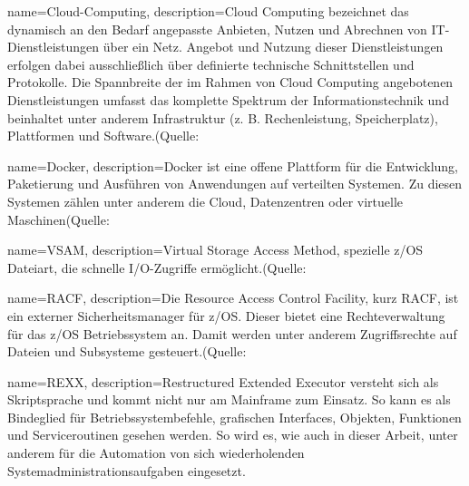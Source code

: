 {
	name=Cloud-Computing,
	description={\glqq Cloud Computing bezeichnet das dynamisch an den Bedarf angepasste Anbieten, Nutzen und Abrechnen von IT-Dienstleistungen über ein Netz. Angebot und Nutzung dieser Dienstleistungen erfolgen dabei ausschließlich über definierte technische Schnittstellen und Protokolle. Die Spannbreite der im Rahmen von Cloud Computing angebotenen Dienstleistungen umfasst das komplette Spektrum der Informationstechnik und beinhaltet unter anderem Infrastruktur (z. B. Rechenleistung, Speicherplatz), Plattformen und Software.\grqq(Quelle: \cite{.23.2.2020b}}
}

{
	name=Docker,
	description={Docker ist eine offene Plattform für die Entwicklung, Paketierung und Ausführen von Anwendungen auf verteilten Systemen. Zu diesen Systemen zählen unter anderem die Cloud, Datenzentren oder virtuelle Maschinen(Quelle: \cite{Vohra.2016}}
}

{
	name=VSAM,
	description={Virtual Storage Access Method, spezielle z/OS Dateiart, die schnelle I/O-Zugriffe ermöglicht.(Quelle: \cite[S. 2-4]{Lovelace.2013}}
}

{
	name=RACF,
	description={Die Resource Access Control Facility, kurz RACF, ist ein externer Sicherheitsmanager für z/OS.
Dieser bietet eine Rechteverwaltung für das z/OS Betriebssystem an.
Damit werden unter anderem Zugriffsrechte auf Dateien und Subsysteme gesteuert.(Quelle: \cite[S. 18-21]{Karan.2008}}
}

{
	name=REXX,
	description={Restructured Extended Executor versteht sich als Skriptsprache und kommt nicht nur am Mainframe zum Einsatz.
So kann es als Bindeglied für Betriebssystembefehle, grafischen Interfaces, Objekten, Funktionen und Serviceroutinen gesehen werden.
So wird es, wie auch in dieser Arbeit, unter anderem für die Automation von sich wiederholenden Systemadministrationsaufgaben eingesetzt.
\cite{Fosdick.2005}}
}